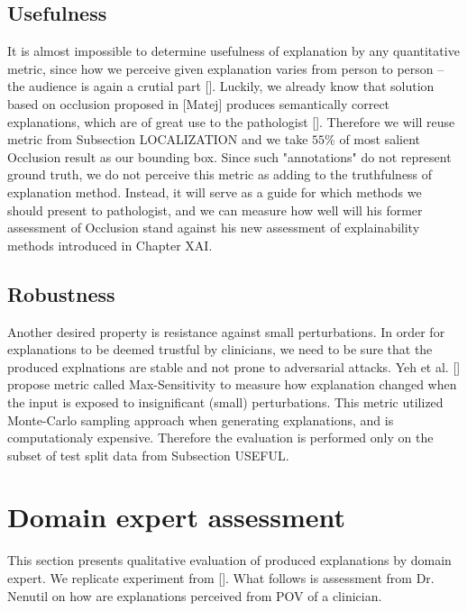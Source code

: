 \subsection*{Usefulness}

It is almost impossible to determine usefulness of explanation by any quantitative metric, since how we perceive given explanation varies from person to person -- the audience is again a crutial part []. Luckily, we already know that solution based on occlusion proposed in [Matej] produces semantically correct explanations, which are of great use to the pathologist []. Therefore we will reuse metric from Subsection LOCALIZATION and we take $55$\% of most salient Occlusion result as our bounding box. Since such "annotations" do not represent ground truth, we do not perceive this metric as adding to the truthfulness of explanation method. Instead, it will serve as a guide for which methods we should present to pathologist, and we can measure how well will his former assessment of Occlusion stand against his new assessment of explainability methods introduced in Chapter XAI.

\subsection*{Robustness}
Another desired property is resistance against small perturbations. In order for explanations to be deemed trustful by clinicians, we need to be sure that the produced explnations are stable and not prone to adversarial attacks. Yeh et al. [] propose metric called Max-Sensitivity to measure how explanation changed when the input is exposed to insignificant (small) perturbations. This metric utilized Monte-Carlo sampling approach when generating explanations, and is computationaly expensive. Therefore the evaluation is performed only on the subset of test split data from Subsection USEFUL.


\section{Domain expert assessment}

This section presents qualitative evaluation of produced explanations by domain expert. We replicate experiment from []. What follows is assessment from Dr. Nenutil on how are explanations perceived from POV of a clinician.
